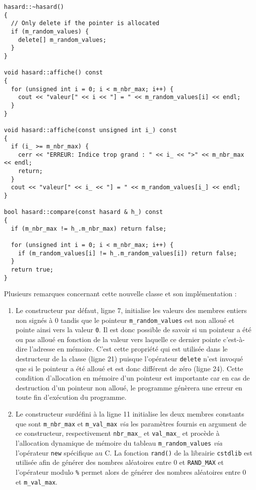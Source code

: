 \documentclass{book}
\newcommand{\cpp}{\mbox{C\vspace{.5em}\protect\raisebox{.2ex}{\footnotesize++~}}}
\begin{document}
\begin{correction}
\begin{verbatim}
hasard::~hasard()
{
  // Only delete if the pointer is allocated
  if (m_random_values) {
    delete[] m_random_values;
  }
}

void hasard::affiche() const
{
  for (unsigned int i = 0; i < m_nbr_max; i++) {
    cout << "valeur[" << i << "] = " << m_random_values[i] << endl;
  }
}

void hasard::affiche(const unsigned int i_) const
{
  if (i_ >= m_nbr_max) {
    cerr << "ERREUR: Indice trop grand : " << i_ << ">" << m_nbr_max << endl;
    return;
  }
  cout << "valeur[" << i_ << "] = " << m_random_values[i_] << endl;
}

bool hasard::compare(const hasard & h_) const
{
  if (m_nbr_max != h_.m_nbr_max) return false;

  for (unsigned int i = 0; i < m_nbr_max; i++) {
    if (m_random_values[i] != h_.m_random_values[i]) return false;
  }
  return true;
}
\end{verbatim}

Plusieurs remarques concernant cette nouvelle classe et son implémentation :

\begin{enumerate}
\item Le constructeur par défaut, ligne 7, initialise les valeurs des membres
entiers non signés à 0 tandis que le pointeur \texttt{m\_random\_values} est non alloué
et pointe ainsi vers la valeur \texttt{0}. Il est donc possible de savoir si un
pointeur a été ou pas alloué en fonction de la valeur vers laquelle ce
dernier pointe c'est-à-dire l'adresse en mémoire. C'est cette propriété qui
est utilisée dans le destructeur de la classe (ligne 21) puisque l'opérateur
\texttt{delete} n'est invoqué que si le pointeur a été alloué et est donc différent de
zéro (ligne 24). Cette condition d'allocation en mémoire d'un pointeur est
importante car en cas de destruction d'un pointeur non alloué, le programme
génèrera une erreur en toute fin d'exécution du programme.

\item Le constructeur surdéfini à la ligne 11 initialise les deux membres constants
que sont \texttt{m\_nbr\_max} et \texttt{m\_val\_max} \emph{via} les paramètres fournis en argument de ce
constructeur, respectivement \texttt{nbr\_max\_} et \texttt{val\_max\_} et procède à l'allocation
dynamique de mémoire du tableau \texttt{m\_random\_values} \emph{via} l'opérateur \texttt{new}
spécifique au \cpp. La fonction \texttt{rand()} de la librairie \texttt{cstdlib} est utilisée
afin de générer des nombres aléatoires entre 0 et \texttt{RAND\_MAX} et l'opérateur
modulo \texttt{\%} permet alors de générer des nombres aléatoires entre 0 et \texttt{m\_val\_max}.


\end{enumerate}
\end{correction}
\end{document}
